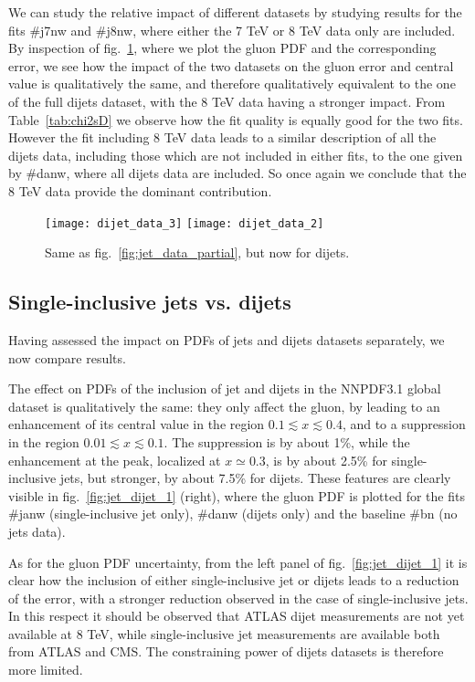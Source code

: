 %
We can study the relative impact of different datasets by studying results for the fits \#j7nw and \#j8nw, where 
either the 7 TeV or 8 TeV data only are included.
By inspection of fig.~\ref{fig:dijet_data_partial}, where we plot the gluon PDF and the corresponding error,
we see how the impact of the two datasets 
on the gluon error and central value is qualitatively the same, and therefore qualitatively equivalent to the one of the 
full dijets dataset, with the 8 TeV data having a stronger impact.
From Table~\ref{tab:chi2sD} we observe how the fit quality is equally good for the two fits.
However the fit including 8 TeV data leads to a similar description of all the dijets data, including those which are
not included in either fits, to the one given by \#danw, where all dijets data are included.
So once again we conclude that the 8 TeV data provide the dominant contribution.
    \begin{figure}[!t]
    \centering
    \texttt{[image: dijet\_data\_3]}
    \texttt{[image: dijet\_data\_2]}
    \caption{Same as fig.~\ref{fig:jet_data_partial}, but now for dijets.}
    \label{fig:dijet_data_partial}
\end{figure}

\subsection{Single-inclusive jets vs. dijets}
Having assessed the impact on PDFs of jets and dijets datasets separately, we now compare results.

%
The effect on PDFs of the inclusion of jet and dijets in the NNPDF3.1 global dataset is qualitatively the same:
they only affect the gluon, by leading to an enhancement of its central value in the region
$0.1\lesssim x \lesssim 0.4$, and to a  
suppression in the region $0.01\lesssim x \lesssim 0.1$. The suppression
is by about  1\%, while the enhancement at the peak, localized at  $x\simeq 0.3$, is  by about 2.5\%
for single-inclusive jets, but stronger, by about 7.5\% for dijets.
These features are clearly visible in fig.~\ref{fig:jet_dijet_1} (right), where the gluon PDF is plotted
for the fits \#janw (single-inclusive jet only), \#danw (dijets only) and the baseline \#bn (no jets data).

%
As for the gluon PDF uncertainty, from the left panel of fig.~\ref{fig:jet_dijet_1} it is clear how
the inclusion of either single-inclusive jet or dijets leads to a reduction of the error, with a stronger
reduction observed in the case of single-inclusive jets. In this respect it should be observed that
ATLAS dijet measurements are not yet available at 8 TeV, while single-inclusive jet measurements are available both from
ATLAS and CMS. The constraining power of dijets datasets is therefore more limited.

